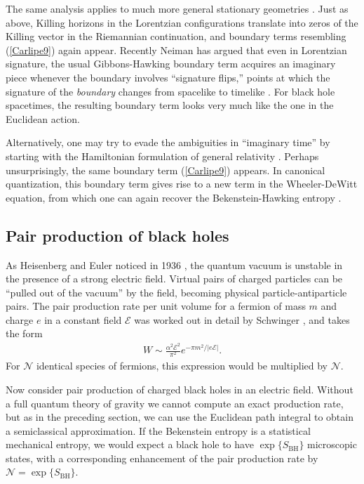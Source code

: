 \documentclass[12pt]{article}
\begin{document}
The same analysis applies to much more general stationary geometries 
\cite{HawkingHunter}.  Just as above, Killing horizons in the Lorentzian 
configurations translate into zeros of the Killing vector in the Riemannian 
continuation, and boundary terms resembling (\ref{Carlipe9}) again appear.   
Recently Neiman has argued that even in Lorentzian signature,
the usual Gibbons-Hawking boundary term acquires an imaginary 
piece whenever the boundary involves ``signature flips,'' 
points at which the signature of the \emph{boundary} changes 
from spacelike to timelike \cite{Neiman}.  For 
black hole spacetimes, the resulting boundary term looks very 
much like the one in the Euclidean action.
 
Alternatively, one may try to evade the ambiguities in ``imaginary 
time'' by starting with the Hamiltonian formulation of general relativity 
\cite{Teitelboim}.   Perhaps unsurprisingly, the same boundary term
(\ref{Carlipe9}) appears.  In canonical quantization, this boundary term  
gives rise to a new term in the Wheeler-DeWitt equation, from which 
one can again recover the Bekenstein-Hawking entropy \cite{CarTeit}.

\subsection{Pair production of black holes}

As Heisenberg and Euler noticed in 1936 \cite{Heisenberg}, the quantum
vacuum is unstable in the presence of a strong electric field.  Virtual 
pairs of charged particles can be ``pulled out of the vacuum'' by the
field, becoming physical particle-antiparticle pairs.  The pair production
rate per unit volume for a fermion of mass $m$ and charge $e$ in a 
constant field $\mathcal{E}$ was worked out in detail by Schwinger 
\cite{Schwinger}, and takes the form
\begin{align*}
W \sim \frac{\alpha^2\mathcal{E}^2}{\pi^2} e^{- \pi m^2/|e\mathcal{E}|}  .
\end{align*}
For $\mathcal{N}$ identical species of fermions, this expression would be
multiplied by $\mathcal{N}$.

Now consider pair production of charged black holes in an electric field.  
Without a full quantum theory of gravity we cannot compute an exact 
production rate, but as in the preceding section, we can use the
Euclidean path integral  to obtain a semiclassical approximation.  
If the Bekenstein entropy is a statistical mechanical entropy, we would 
expect a black hole to have $\exp\{S_{\scriptscriptstyle\mathrm{BH}}\}$
microscopic states, with a corresponding enhancement of the pair
production rate by $\mathcal{N} = \exp \{S_{\scriptscriptstyle\mathrm{BH}}\}$.
\end{document}
